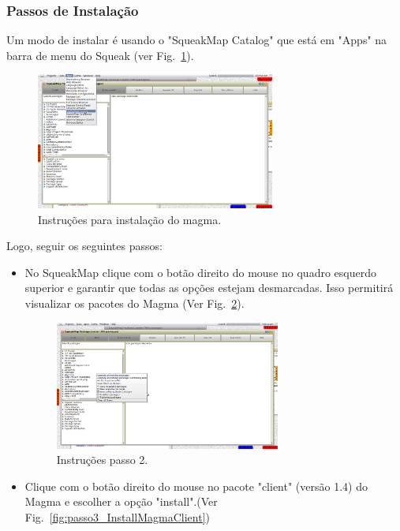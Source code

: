 \documentclass[a4paper, 10pt]{article}
\begin{document}
\begin{newpage}
\subsubsection{Passos de Instalação}

Um modo de instalar é usando o "SqueakMap Catalog" que está em "Apps" na barra de menu do Squeak (ver Fig.~\ref{fig:passo1_InstallMagma1}).

\begin{figure}[!htb]
\centering
\includegraphics[width=0.7\textwidth]{passo1_InstallMagma1.png}
\caption{Instruções para instalação do magma.}
\label{fig:passo1_InstallMagma1}
\end{figure}

Logo, seguir os seguintes passos:
\begin{itemize}
\item{No SqueakMap clique com o botão direito do mouse no quadro esquerdo superior e garantir que todas as opções estejam desmarcadas. Isso permitirá visualizar os pacotes do Magma (Ver Fig.~\ref{fig:passo2_InstallMagma2}).}

\begin{figure}[!htb]
\centering
\includegraphics[width=0.7\textwidth]{passo2_InstallMagma2.png}
\caption{Instruções passo 2.}
\label{fig:passo2_InstallMagma2}
\end{figure}


\item{Clique com o botão direito do mouse no pacote "client" (versão 1.4) do Magma e escolher a opção "install".(Ver Fig.~\ref{fig:passo3_InstallMagmaClient})}


\end{itemize}
\end{newpage}
\end{document}
